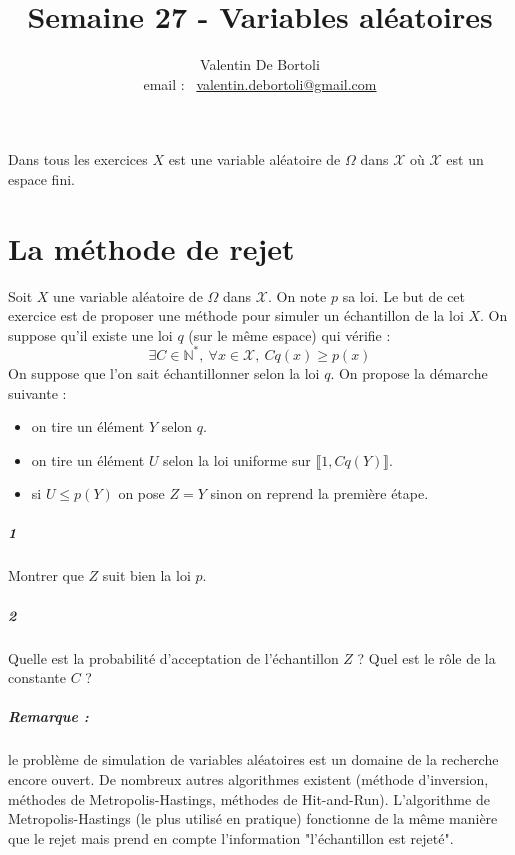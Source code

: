 \documentclass[10pt,a4paper]{article}
\title{Semaine 27 - Variables aléatoires}
\author{Valentin De Bortoli \\ email : \ \href{mailto:valentin.debortoli@gmail.com}{valentin.debortoli@gmail.com}}
\date{}
\begin{document}
\maketitle
Dans tous les exercices $X$ est une variable aléatoire de $\Omega$ dans $\mathcal{X}$ où $\mathcal{X}$ est un espace fini.
\section{La méthode de rejet}
Soit $X$ une variable aléatoire de $\Omega$ dans $\mathcal{X}$. On note $p$ sa loi.
Le but de cet exercice est de proposer une méthode pour simuler un échantillon de la loi $X$. On suppose qu'il existe une loi $q$ (sur le même espace) qui vérifie :
\begin{equation*}
\exists C \in \mathbb{N}^*, \ \forall x \in \mathcal{X}, \ Cq(x) \ge p(x)
\end{equation*}
On suppose que l'on sait échantillonner selon la loi $q$.
On propose la démarche suivante :
\begin{itemize}
\item on tire un élément $Y$ selon $q$.
\item on tire un élément $U$ selon la loi uniforme sur $\llbracket 1, Cq(Y) \rrbracket$.
\item si $U \le p(Y)$ on pose $Z=Y$ sinon on reprend la première étape.
\end{itemize}
\subparagraph{1}Montrer que $Z$ suit bien la loi $p$.
\subparagraph{2}Quelle est la probabilité d'acceptation de l'échantillon $Z$ ? Quel est le rôle de la constante $C$ ?
\subparagraph{Remarque :} le problème de simulation de variables aléatoires est un domaine de la recherche encore ouvert. De nombreux autres algorithmes existent (méthode d'inversion, méthodes de Metropolis-Hastings, méthodes de Hit-and-Run). L'algorithme de Metropolis-Hastings (le plus utilisé en pratique) fonctionne de la même manière que le rejet mais prend en compte l'information "l'échantillon est rejeté".
\end{document}
